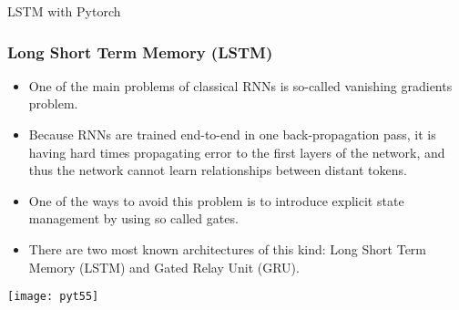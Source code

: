\begin{frame}
  \begin{center}
    {\Large LSTM with Pytorch}
    
  \end{center}
\end{frame}


\begin{frame}[fragile] \frametitle{Long Short Term Memory (LSTM)}


\begin{itemize}
\item  One of the main problems of classical RNNs is so-called vanishing gradients problem. 
\item  Because RNNs are trained end-to-end in one back-propagation pass, it is having hard times propagating error to the first layers of the network, and thus the network cannot learn relationships between distant tokens. 
\item  One of the ways to avoid this problem is to introduce explicit state management by using so called gates. 
\item  There are two most known architectures of this kind: Long Short Term Memory (LSTM) and Gated Relay Unit (GRU).
\end{itemize}

\begin{center}
\texttt{[image: pyt55]}
\end{center}

\end{frame}


